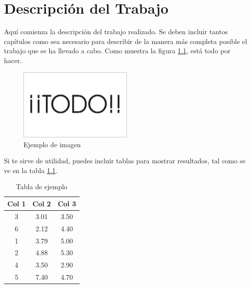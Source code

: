 \chapter{Descripción del Trabajo}
\label{cap:descripcionTrabajo}

Aquí comienza la descripción del trabajo realizado. Se deben incluir tantos capítulos como sea necesario para describir de la manera más completa posible el trabajo que se ha llevado a cabo. Como muestra la figura \ref{fig:sampleImage}, está todo por hacer.

\begin{figure}[H]
	\centering
	\includegraphics[width = 0.5\textwidth]{Imagenes/Vectorial/Todo.pdf}
	\caption{Ejemplo de imagen}
	\label{fig:sampleImage}
\end{figure}

Si te sirve de utilidad, puedes incluir tablas para mostrar resultados, tal como se ve en la tabla \ref{tab:sampleTable}.


\begin{table}
	\centering
	\begin{tabular}{c|c|c}
		\textbf{Col 1} & \textbf{Col 2} & \textbf{Col 3} \\
		\hline\hline
		3 & 3.01 & 3.50\\
		6 & 2.12 & 4.40\\
		1 & 3.79 & 5.00\\
		2 & 4.88 & 5.30\\
		4 & 3.50 & 2.90\\
		5 & 7.40 & 4.70\\
		\hline
	\end{tabular}
	\caption{Tabla de ejemplo}
	\label{tab:sampleTable}
\end{table}
	
